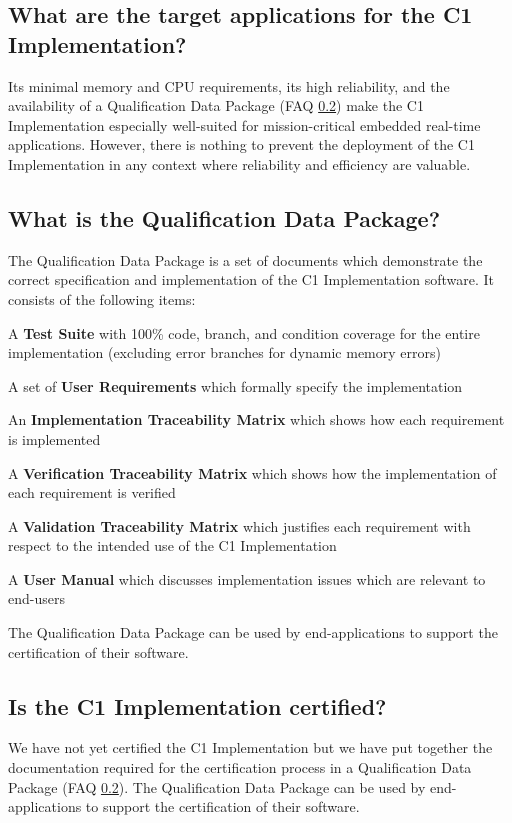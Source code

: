 \documentclass[faq]{../fwprofile}
\begin{document}
\subsection{What are the target applications for the C1 Implementation?}
Its minimal memory and CPU requirements, its high reliability, and the availability of a Qualification Data Package (FAQ \ref{faq:qualification_data_package}) make the C1 Implementation especially well-suited for mission-critical embedded real-time applications. However, there is nothing to prevent the deployment of the C1 Implementation in any context where reliability and efficiency are valuable.

\subsection{What is the Qualification Data Package?}\label{faq:qualification_data_package}
The Qualification Data Package is a set of documents which demonstrate the correct specification and implementation of the C1 Implementation software. 
It consists of the following items:

\begin{fw_itemize} 
\item A \textbf{Test Suite} with 100\% code, branch, and condition coverage for the entire implementation (excluding error branches for dynamic memory errors)
\item A set of \textbf{User Requirements} which formally specify the implementation
\item An \textbf{Implementation Traceability Matrix} which shows how each requirement is implemented
\item A \textbf{Verification Traceability Matrix} which shows how the implementation of each requirement is verified
\item A \textbf{Validation Traceability Matrix} which justifies each requirement with respect to the intended use of the C1 Implementation
\item A \textbf{User Manual} which discusses implementation issues which are relevant to end-users
\end{fw_itemize}

The Qualification Data Package can be used by end-applications to support 
the certification of their software.

\subsection{Is the C1 Implementation certified?}
We have not yet certified the C1 Implementation but we have put together the documentation required for the certification process in a Qualification 
Data Package (FAQ \ref{faq:qualification_data_package}). The Qualification Data Package  can be used by end-applications to support the certification of their software.
\end{document}
